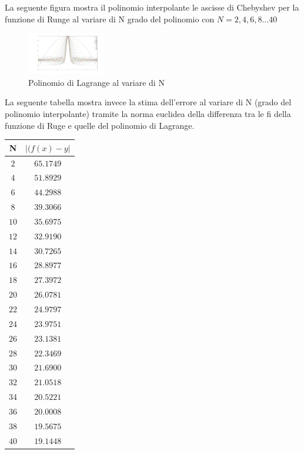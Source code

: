 La seguente figura mostra il polinomio interpolante le ascisse
di Chebyshev per la funzione di Runge al variare di N grado del polinomio con
$N=2,4,6,8...40$
\\
\begin{figure}[H]
  \label{Cap_4_Es_7(2)}
  \includegraphics[left, width=130px]{Plot/Cap_4_Es_7(2)}
    \caption{Polinomio di Lagrange al variare di N}
\end{figure}
La seguente tabella mostra invece la stima dell'errore al variare di N (grado del polinomio interpolante) tramite la norma euclidea 
della differenza tra le fi della funzione di Ruge e quelle del polinomio di Lagrange.

\begin{center}
	\begin{tabular}{|c|c|}
		\hline
			N & $|(f(x)-y|$ \\
    \hline
    $2$  & $65.1749$ \\
    $4$  & $51.8929$ \\
    $6$  & $44.2988$ \\
    $8$  & $39.3066$ \\
    $10$ & $35.6975$ \\
    $12$ & $32.9190$ \\
    $14$ & $30.7265$ \\
    $16$ & $28.8977$ \\
    $18$ & $27.3972$ \\
    $20$ & $26.0781$ \\
    $22$ & $24.9797$ \\
    $24$ & $23.9751$ \\
    $26$ & $23.1381$ \\
    $28$ & $22.3469$ \\
    $30$ & $21.6900$ \\
    $32$ & $21.0518$ \\
    $34$ & $20.5221$ \\
    $36$ & $20.0008$ \\
    $38$ & $19.5675$ \\
    $40$ & $19.1448$ \\
		\hline
	\end{tabular}
\end{center} 